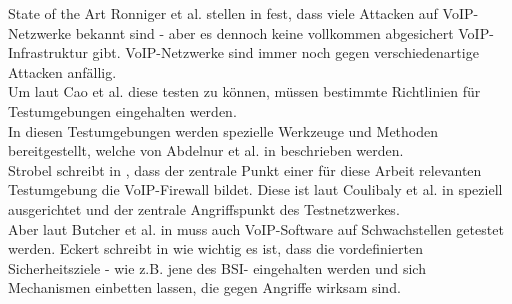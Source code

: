\begin{section}{State of the Art}
	\DIFaddend Ronniger et al. stellen in \cite{Ronniger:2010:robflex} fest, dass viele Attacken auf
	VoIP-Netzwerke bekannt sind - aber es dennoch keine vollkommen abgesichert 
	VoIP-Infrastruktur gibt. VoIP-Netzwerke sind immer noch gegen verschiedenartige Attacken anfällig. \\
	Um laut Cao et al. \cite{CaoWang:2009:DevLab} diese testen zu können, 
	müssen bestimmte Richtlinien für Testumgebungen eingehalten werden. \\
	In diesen Testumgebungen werden spezielle Werkzeuge und Methoden bereitgestellt, 
	welche von Abdelnur et al. in \cite{Abdelnur:2006:voipass} beschrieben werden.  \\
	Strobel schreibt in \cite{strobel:2003:firewalls}, dass der zentrale Punkt einer für diese 
	Arbeit relevanten Testumgebung die VoIP-Firewall bildet. 
	Diese ist laut Coulibaly et al. in \cite{Coulibaly:2010:secvoipb} speziell ausgerichtet 
	und der zentrale Angriffspunkt des Testnetzwerkes. \\
	Aber laut Butcher et al. in  \cite{Butcher:2007:SecChall} muss auch 
	VoIP-Software auf Schwachstellen getestet werden. 
	Eckert schreibt in  \cite{eckert:2009:sicherheit} wie wichtig es ist, 
	dass die vordefinierten Sicherheitsziele - wie z.B. jene des \DIFdelbegin {}\DIFdelend \DIFaddbegin \ac{BSI}\DIFaddend - 
	eingehalten werden und sich Mechanismen einbetten lassen, die gegen Angriffe wirksam sind. 
	\\
	\DIFdelbegin {}%
\DIFdelend %
	\DIFaddbegin 


\end{section}
